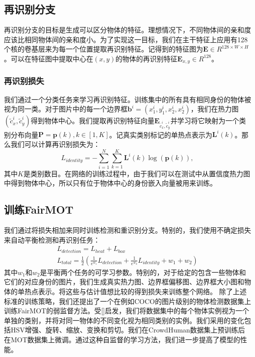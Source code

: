 \documentclass{ctexart}
\begin{document}
\subsection{再识别分支}
再识别分支的目标是生成可以区分物体的特征。理想情况下，不同物体间的亲和度应该比相同物体间的亲和度小。为了实现这一目标，我们在主干特征上应用有128个核的卷基层来为每一个位置提取再识别特征。记得到的特征图为$\bm{E}\in R^{128\times W \times H}$。可以在特征图中提取中心在$(x,y)$的物体的再识别特征$\bm{E}_{x,y}\in R^{128}$。
\subsubsection{再识别损失}
我们通过一个分类任务来学习再识别特征。训练集中的所有具有相同身份的物体被视为同一类。对于图片中的每一个边界框$\bm{b}^i = (x_1^i, y_1^i,x_2^i,x_2^i)$，我们在热力图$(\tilde{c}_x^i, \tilde{c}_y^i)$得到物体中心。我们提取再识别特征向量$\bm{E}_{\tilde{c}_x^i, \tilde{c}_y^i}$并学习将它映射为一个类别分布向量$\bm{P}={\bm{p}(k), k\in [1, K]}$。记真实类别标记的单热点表示为$\bm{L}^i(k)$。那么我们可以计算再识别损失为：
\begin{equation}
    L_{identity}=-\sum_{i=1}^N\sum_{k=1}^K\bm{L}^i(k)\log(\bm{p}(k)),
\end{equation}
其中$K$是类别数目。在网络的训练过程中，由于我们可以在测试中从置信度热力图中得到物体中心，所以只有位于物体中心的身份嵌入向量被用来训练。
\subsection{训练FairMOT}
我们通过将损失相加来同时训练检测和重识别分支。特别的，我们使用不确定损失来自动平衡检测和再识别任务：
\begin{eqnarray}
    L_{detection} = L_{heat} + L_{box} \\
    L_{total}=\frac{1}{2} \left(  \frac{1}{e^{w_1}}L_{detection} + \frac{1}{e^{w_2}}L_{identity} + w_1 + w_2 \right)
\end{eqnarray}
其中$w_1$和$w_2$是平衡两个任务的可学习参数。特别的，对于给定的包含一些物体和它们的对应身份的图片，我们生成真实热力图、边界框偏移图、边界框大小图和物体的单热点表示。将这些与估计值想比较的得到损失来训练整个网络。\newline
除了上述标准的训练策略，我们还提出了一个在例如COCO的图片级别的物体检测数据集上训练FairMOT的弱监督方法。受[]启发，我们将数据集中的每个物体实例视为一个单独的类别，并将对同一物体的不同变化视为相同类别的实例。我们采用的变化包括HSV增强、旋转、缩放、变换和剪切。我们在CrowdHuman数据集上预训练后在MOT数据集上微调。通过这种自监督的学习方法，我们进一步提高了模型的性能。
\end{document}
